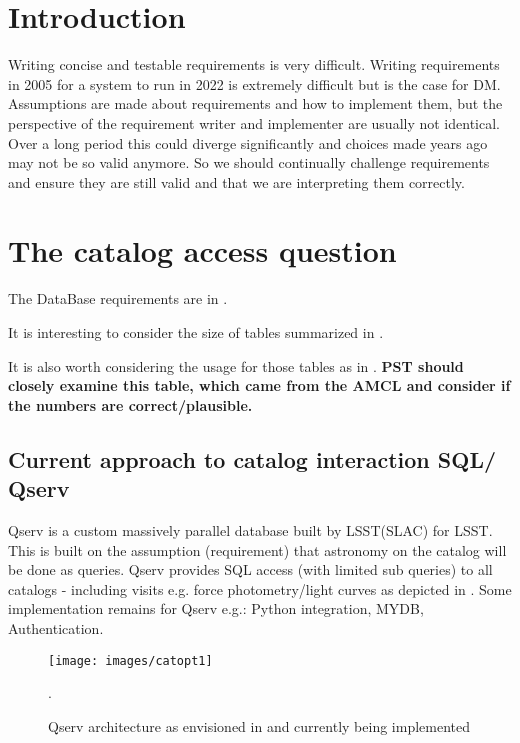 \section{Introduction} \label{sec:intro}
 Writing concise and testable requirements is very difficult.
 Writing requirements in 2005 for a system to run in 2022 is extremely difficult but is the case for DM.
Assumptions are made about requirements and how to implement them, but
the perspective of the requirement writer and implementer are usually not identical.
Over a long period this could diverge significantly and  choices made years ago may not be so valid anymore.
So we should continually challenge requirements and ensure they are still valid and that we are interpreting them correctly.


\section{The catalog  access  question}\label{sec:cat}
The DataBase requirements are in .

It is interesting to consider the size of tables summarized in .


It is also worth considering the usage for those tables as in . {\bf PST should closely examine this table, which came from the AMCL and consider if the numbers are correct/plausible.}

\subsection{Current approach to catalog interaction SQL/ Qserv}
\label{sec:qserv}
Qserv is a custom massively parallel database built  by LSST(SLAC) for LSST.
This is built on the assumption (requirement) that astronomy on the catalog will be done as queries.
Qserv provides SQL access (with limited sub queries) to all catalogs - including visits e.g. force photometry/light curves as depicted in .
Some implementation remains for Qserv e.g.: Python integration, MYDB, Authentication.

\begin{figure}
\begin{center}
 \texttt{[image: images/catopt1]}
\caption{Qserv architecture as envisioned in   and currently being implemented \label{fig:catopt1}}.
\end{center}
\end{figure}


